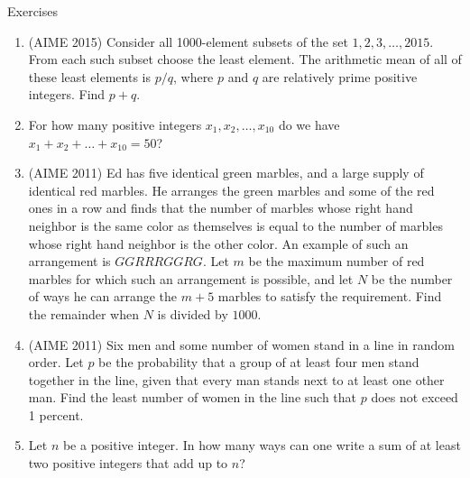 \begin{xcb}{Exercises}
\begin{enumerate}
\begin{hint}
\end{hint}
\item (AIME 2015)  Consider all 1000-element subsets of the set ${{1, 2, 3, \dots , 2015}}$. From each such subset choose the least element. The arithmetic mean of all of these least elements is $p/q$, where $p$ and $q$ are relatively prime positive integers. Find $p + q$.
\begin{hint}
\end{hint}
\item {} For how many positive integers $x_1, x_2, \dots, x_{10}$ do we have $x_1 + x_2 + \dots + x_{10} = 50$?
\item (AIME 2011)  Ed has five identical green marbles, and a large supply of identical red marbles. He arranges the green marbles and some of the red ones in a row and finds that the number of marbles whose right hand neighbor is the same color as themselves is equal to the number of marbles whose right hand neighbor is the other color. An example of such an arrangement is $GGRRRGGRG$. Let $m$ be the maximum number of red marbles for which such an arrangement is possible, and let $N$ be the number of ways he can arrange the $m+5$ marbles to satisfy the requirement. Find the remainder when $N$ is divided by $1000$.
\begin{hint}
\end{hint}
\item (AIME 2011)  Six men and some number of women stand in a line in random order. Let $p$ be the probability that a group of at least four men stand together in the line, given that every man stands next to at least one other man. Find the least number of women in the line such that $p$ does not exceed 1 percent.
\begin{hint}
\end{hint}
\item {} Let $n$ be a positive integer. In how many ways can one write a sum of at least two positive integers that add up to $n$?

\end{enumerate}
\end{xcb}
